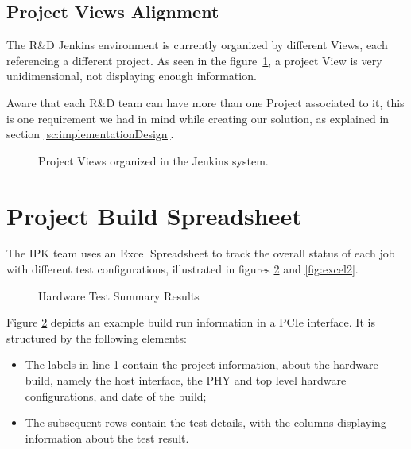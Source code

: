 \subsection{Project Views Alignment}\label{sc:projOrg}

The R\&D Jenkins environment is currently organized by different Views, each referencing a different project. As seen in the figure~\ref{fig:allViews}, a project View is very unidimensional, not displaying enough information.

Aware that each R\&D team can have more than one Project associated to it, this is one requirement we had in mind while creating our solution, as explained in section \ref{sc:implementationDesign}.

  \begin{figure}[H]
  \centering
      \caption{Project Views organized in the Jenkins system.}
      \label{fig:allViews}
  \end{figure}

\section{Project Build Spreadsheet}\label{sec:spreadsheet}

The IPK team uses an Excel Spreadsheet to track the overall status of each job with different test configurations, illustrated in figures \ref{fig:excel1} and \ref{fig:excel2}. 

  \begin{figure}[H]
  \centering
      \caption{Hardware Test Summary Results}
      \label{fig:excel1}
  \end{figure}
  
Figure \ref{fig:excel1} depicts an example build run information in a PCIe interface. It is structured by the following elements:

\begin{itemize}
\item The labels in line 1 contain the project information, about the hardware build, namely the host interface, the PHY\cite{PHY} and top level hardware configurations, and date of the build;

\item The subsequent rows contain the test details, with the columns displaying information about the test result.
\end{itemize}
  
